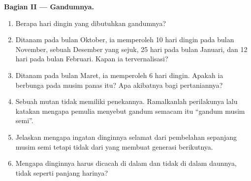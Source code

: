 \begin{problem}
\medskip
\noindent\textbf{Bagian II --- Gandumnya.}
\begin{enumerate}[resume]
  \item Berapa hari dingin yang dibutuhkan gandumnya?
  \item Ditanam pada bulan Oktober, ia memperoleh 10 hari dingin pada
        bulan November, sebuah Desember yang sejuk, 25 hari pada bulan
        Januari, dan 12 hari pada bulan Februari. Kapan ia
        tervernalisasi?
  \item Ditanam pada bulan Maret, ia memperoleh 6 hari dingin. Apakah
        ia berbunga pada musim panas itu? Apa akibatnya bagi
        pertaniannya?
  \item Sebuah mutan tidak memiliki penekannya. Ramalkanlah
        perilakunya lalu katakan mengapa pemulia menyebut gandum
        semacam itu ``gandum musim semi''.
  \item Jelaskan mengapa ingatan dinginnya selamat dari pembelahan
         sepanjang musim semi tetapi tidak dari  yang
        membuat generasi berikutnya.
  \item Mengapa dinginnya harus dicacah di dalam  dan tidak
        di dalam daunnya, tidak seperti panjang harinya?
\end{enumerate}


\end{problem}
